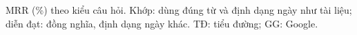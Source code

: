 MRR (\%) theo kiểu câu hỏi. Khớp: dùng đúng từ và định dạng ngày như tài liệu; diễn đạt: đồng nghĩa, định dạng ngày khác. TĐ: tiểu đường; GG: Google.
